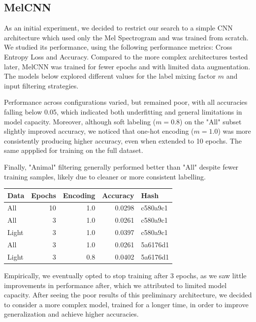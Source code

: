 \documentclass[10pt]{article}
\begin{document}
\subsection*{MelCNN}

As an initial experiment, we decided to restrict our search to a simple CNN architecture which used only the Mel Spectrogram and was trained from scratch. We studied its performance, using the following performance metrics: Cross Entropy Loss and Accuracy. Compared to the more complex architectures tested later, MelCNN was trained for fewer epochs and with limited data augmentation. The models below explored different values for the label mixing factor $m$ and input filtering strategies.

Performance across configurations varied, but remained poor, with all accuracies falling below 0.05, which indicated both underfitting and general limitations in model capacity. Moreover, although soft labeling ($m=0.8$) on the "All" subset slightly improved accuracy, we noticed that one-hot encoding ($m=1.0$) was more consistently producing higher accuracy, even when extended to 10 epochs. The same appplied for training on the full dataset.

Finally, "Animal" filtering generally performed better than "All" despite fewer training samples, likely due to cleaner or more consistent labelling.

\begin{table}[h!]
  \centering
  \begin{tabular}{|l|r|r|r|l|}
    \hline
    Data  & Epochs & Encoding & Accuracy & Hash     \\
    \hline
    All    & 10     & 1.0      & 0.0298   & c580a9c1 \\
    All    & 3      & 1.0      & 0.0261   & c580a9c1 \\
    Light  & 3      & 1.0      & 0.0397   & c580a9c1 \\
    All    & 3      & 1.0      & 0.0261   & 5a6176d1 \\
    Light  & 3      & 0.8      & 0.0402   & 5a6176d1 \\
    \hline
  \end{tabular}
  \label{tab:results}
\end{table}

Empirically, we eventually opted to stop training after 3 epochs, as we saw little improvements in performance after, which we attributed to limited model capacity. After seeing the poor results of this preliminary architecture, we decided to consider a more complex model, trained for a longer time, in order to improve generalization and achieve higher accuracies.
\end{document}
